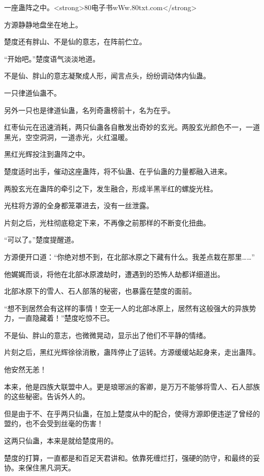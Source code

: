 
\begin{this_body}

一座蛊阵之中。<strong>80电子书wWw.80txt.com</strong>

方源静静地盘坐在地上。

楚度还有胖山、不是仙的意志，在阵前伫立。

“开始吧。”楚度语气淡淡地道。

不是仙、胖山的意志凝聚成人形，闻言点头，纷纷调动体内仙蛊。

一只律道仙蛊不。

另外一只也是律道仙蛊，名列奇蛊榜前十，名为在乎。

红枣仙元在迅速消耗，两只仙蛊各自散发出奇妙的玄光。两股玄光颜色不一，一道黑光，空空洞洞，一道赤光，火红温暖。

黑红光辉投注到蛊阵之中。

楚度适时出手，催动这座蛊阵，将不仙蛊、在乎仙蛊的力量都融入进来。

两股玄光在蛊阵的牵引之下，发生融合，形成半黑半红的螺旋光柱。

光柱将方源的全身都笼罩进去，没有一丝泄露。

片刻之后，光柱彻底稳定下来，不再像之前那样的不断变化扭曲。

“可以了。”楚度提醒道。

方源便开口道：“你绝对想不到，在北部冰原之下藏有什么。我差点栽在那里……”

他娓娓而谈，将他在北部冰原渡劫时，遭遇到的恐怖人劫都详细道出。

北部冰原下的雪人、石人部落的秘密，也暴露在楚度的面前。

“想不到居然会有这样的事情！空无一人的北部冰原上，居然有这般强大的异族势力，一直隐藏着！”楚度吃惊不已。

不是仙、胖山的意志，也微微晃动，显示出了他们不平静的情绪。

片刻之后，黑红光辉徐徐消散，蛊阵停止了运转。方源缓缓站起身来，走出蛊阵。

他安然无恙！

本来，他是四族大联盟中人。更是琅琊派的客卿，是万万不能够将雪人、石人部族的这些秘密。告诉外人的。

但是由于不、在乎两只仙蛊，在加上楚度从中的配合，使得方源即便违逆了曾经的盟约，也不会受到丝毫的伤害！

这两只仙蛊，本来是就给楚度用的。

楚度的打算，一直都是和百足天君讲和。依靠死缠烂打，强硬的防守，和最终的妥协。来保住黑凡洞天。


\end{this_body}

